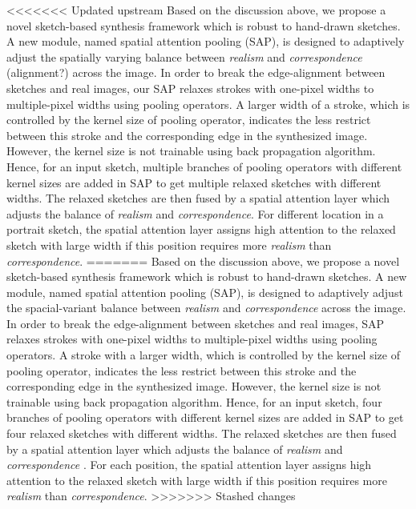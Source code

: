 <<<<<<< Updated upstream
Based on the discussion above, we propose a novel sketch-based synthesis framework which is robust to hand-drawn sketches. A new module, named spatial attention pooling (SAP), is designed to adaptively adjust the spatially varying balance between \textit{realism} and \textit{correspondence} \cxj(alignment?) across the image. In order to break the edge-alignment between sketches and real images, our SAP relaxes strokes with one-pixel widths to multiple-pixel widths using pooling operators. A larger width of a stroke, which is controlled by the kernel size of pooling operator, indicates the less restrict between this stroke and the corresponding edge in the synthesized image. However, the kernel size is not trainable using back propagation algorithm. Hence, for an input sketch, multiple branches of pooling operators with different kernel sizes are added in SAP to get multiple relaxed sketches with different widths. The relaxed sketches are then fused by a spatial attention layer which adjusts the balance of \textit{realism} and \textit{correspondence}. For different location in a portrait sketch, the spatial attention layer assigns high attention to the relaxed sketch with large width if this position requires more \textit{realism} than \textit{correspondence}. 
=======
Based on the discussion above, we propose a novel sketch-based synthesis framework which is robust to hand-drawn sketches. A new module, named spatial attention pooling (SAP), is designed to adaptively adjust the spacial-variant balance between \textit{realism} and \textit{correspondence} across the image. In order to break the edge-alignment between sketches and real images, SAP relaxes strokes with one-pixel widths to multiple-pixel widths using pooling operators. A stroke with a larger width, which is controlled by the kernel size of pooling operator, indicates the less restrict between this stroke and the corresponding edge in the synthesized image. However, the kernel size is not trainable using back propagation algorithm. Hence, for an input sketch, four branches of pooling operators with different kernel sizes are added in SAP to get four relaxed sketches with different widths. The relaxed sketches are then fused by a spatial attention layer which adjusts the balance of \textit{realism} and \textit{correspondence} . For each position, the spatial attention layer assigns high attention to the relaxed sketch with large width if this position requires more \textit{realism} than \textit{correspondence}. 
>>>>>>> Stashed changes

